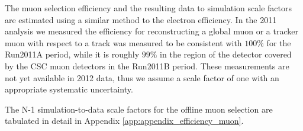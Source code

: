 
The muon selection efficiency and the resulting data to simulation
scale factors are estimated using a similar method to the electron efficiency. 
In the 2011 analysis we measured the efficiency for 
reconstructing a global muon or a tracker muon with respect
to a track was measured to be consistent with $100\%$ for the Run2011A period, 
while it is roughly $99\%$ in the region of the detector covered by the 
CSC muon detectors in the Run2011B period. These measurements are not yet available
in 2012 data, thus we assume a scale factor of one with an appropriate systematic
uncertainty.

The N-1 simulation-to-data scale factors for the offline muon selection
are tabulated in detail in Appendix \ref{app:appendix_efficiency_muon}.

